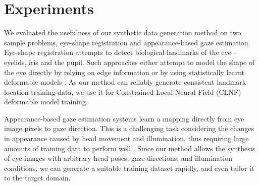 
\section{Experiments}




% 


We evaluated the usefulness of our synthetic data generation method on two sample problems, eye-shape registration and appearance-based gaze estimation.
%
Eye-shape registration attempts to detect biological landmarks of the eye -- eyelids, iris and the pupil. 
Such approaches either attempt to model the shape of the eye directly by relying on edge information \cite{wood2014eyetab, swirski2012robust} or by using statistically learnt deformable models \cite{alabort2014statistically}. 
As our method can reliably generate consistent landmark location training data, we use it for Constrained Local Neural Field (CLNF) \cite{baltrusaitis2013constrained} deformable model training.

Appearance-based gaze estimation systems learn a mapping directly from eye image pixels to gaze direction.
This is a challenging task considering the changes in appearance caused by head movement and illumination, thus requiring large amounts of training data to perform well \cite{zhang15_cvpr}.
%
Since our method allows the synthesis of eye images with arbitrary head poses, gaze directions, and illumination conditions, we can generate a suitable training dataset rapidly, and even tailor it to the target domain.


